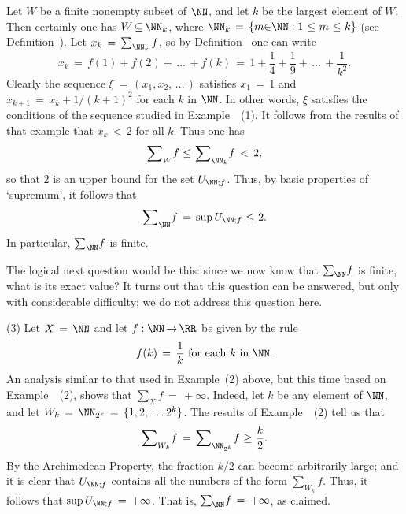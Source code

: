         Let $W$ be a finite nonempty subset of ${\NN}$, and let $k$ be the largest element of $W$.
    Then certainly one has $W \,{\subseteq}\, {\NN}_{k}$,
    where ${\NN}_{k} \,=\, \{m{\in}{\NN}:1\,\,{\leq}\,\,m\,\,{\leq}\,\,k\}$ (see Definition~).
    Let $x_{k} \,=\, \sum_{{\NN}_{k}} f$, so by Definition~ one can write
        \begin{displaymath}
        x_{k} \,=\, f(1) + f(2) + \,{\ldots}\,+ f(k) \,=\, 
    1 + \frac{1}{4} + \frac{1}{9} + \,{\ldots}\,+\frac{1}{k^{2}}.
        \end{displaymath}
    Clearly the sequence ${\xi} \,=\, (x_{1},x_{2},\,{\ldots}\,)$ satisfies $x_{1} \,=\, 1$ and $x_{k+1} \,=\, x_{k}+1/(k+1)^{2}$ for each $k$ in ${\NN}$.
    In other words,  ${\xi}$ satisfies the conditions of the sequence studied in Example~~(1).
    It follows from the results of that example that $x_{k}\,<\,2$ for all $k$.
    Thus one has
        \begin{displaymath}
        {\sum}_{W} f\,\,{\leq}\,\,{\sum}_{{\NN}_{k}} f\,<\, 2,
        \end{displaymath}
    so that $2$ is an upper bound for the set $U_{{\NN};f}$.
    Thus, by basic properties of `supremum', it follows that
        \begin{displaymath}
        {\sum}_{{\NN}} f \,=\, {\sup}\,U_{{\NN};f}\,\,{\leq}\,\,2.
        \end{displaymath}
    In particular, ${\sum}_{{\NN}} f$ is finite.

        The logical next question would be this: since we now know that ${\sum}_{{\NN}} f$ is finite, what is its exact value?
    It turns out that this question can be answered, but only with considerable difficulty;
    we do not address this question here.

\V

        (3) Let $X \,=\, {\NN}$ and let $f:{\NN} \,{\rightarrow}\, {\RR}$ be given by the rule
        \begin{displaymath}
        f(k) \,=\, \frac{1}{k} \mbox{ for each $k$ in ${\NN}$}.
        \end{displaymath}
    An analysis similar to that used in Example~(2) above, but this time based on Example~~(2), shows that ${\sum}_{X} f \,=\, +{\infty}$.
    Indeed, let $k$ be any element of ${\NN}$, and let $W_{k} \,=\, {\NN}_{2^{k}} \,=\, \{1,2,\,{\ldots}\,2^{k}\}$.
    The results of Example~~(2) tell us that
        \begin{displaymath}
        {\sum}_{W_{k}} f \,=\, {\sum}_{{\NN}_{2^{k}}}  f\,\,{\geq}\,\,\frac{k}{2}.
        \end{displaymath}
    By the Archimedean Property, the fraction $k/2$ can become arbitrarily large;
    and it is clear that $U_{{\NN};f}$ contains all the numbers of the form ${\sum}_{W_{k}} f$.
    Thus, it follows that ${\sup}\,U_{{\NN};f} \,=\, +{\infty}$. That is, ${\sum}_{{\NN}} f \,=\, +{\infty}$, as claimed.

